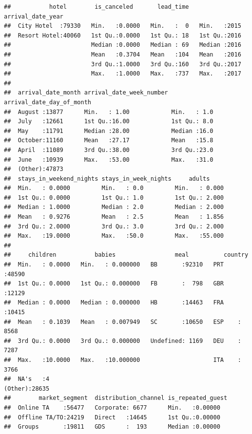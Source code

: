\documentclass[
]{article}
\begin{document}
\begin{verbatim}
##           hotel        is_canceled       lead_time   arrival_date_year
##  City Hotel  :79330   Min.   :0.0000   Min.   :  0   Min.   :2015     
##  Resort Hotel:40060   1st Qu.:0.0000   1st Qu.: 18   1st Qu.:2016     
##                       Median :0.0000   Median : 69   Median :2016     
##                       Mean   :0.3704   Mean   :104   Mean   :2016     
##                       3rd Qu.:1.0000   3rd Qu.:160   3rd Qu.:2017     
##                       Max.   :1.0000   Max.   :737   Max.   :2017     
##                                                                       
##  arrival_date_month arrival_date_week_number arrival_date_day_of_month
##  August :13877      Min.   : 1.00            Min.   : 1.0             
##  July   :12661      1st Qu.:16.00            1st Qu.: 8.0             
##  May    :11791      Median :28.00            Median :16.0             
##  October:11160      Mean   :27.17            Mean   :15.8             
##  April  :11089      3rd Qu.:38.00            3rd Qu.:23.0             
##  June   :10939      Max.   :53.00            Max.   :31.0             
##  (Other):47873                                                        
##  stays_in_weekend_nights stays_in_week_nights     adults      
##  Min.   : 0.0000         Min.   : 0.0         Min.   : 0.000  
##  1st Qu.: 0.0000         1st Qu.: 1.0         1st Qu.: 2.000  
##  Median : 1.0000         Median : 2.0         Median : 2.000  
##  Mean   : 0.9276         Mean   : 2.5         Mean   : 1.856  
##  3rd Qu.: 2.0000         3rd Qu.: 3.0         3rd Qu.: 2.000  
##  Max.   :19.0000         Max.   :50.0         Max.   :55.000  
##                                                               
##     children           babies                 meal          country     
##  Min.   : 0.0000   Min.   : 0.000000   BB       :92310   PRT    :48590  
##  1st Qu.: 0.0000   1st Qu.: 0.000000   FB       :  798   GBR    :12129  
##  Median : 0.0000   Median : 0.000000   HB       :14463   FRA    :10415  
##  Mean   : 0.1039   Mean   : 0.007949   SC       :10650   ESP    : 8568  
##  3rd Qu.: 0.0000   3rd Qu.: 0.000000   Undefined: 1169   DEU    : 7287  
##  Max.   :10.0000   Max.   :10.000000                     ITA    : 3766  
##  NA's   :4                                               (Other):28635  
##        market_segment  distribution_channel is_repeated_guest
##  Online TA    :56477   Corporate: 6677      Min.   :0.00000  
##  Offline TA/TO:24219   Direct   :14645      1st Qu.:0.00000  
##  Groups       :19811   GDS      :  193      Median :0.00000  

\end{verbatim}
\end{document}

